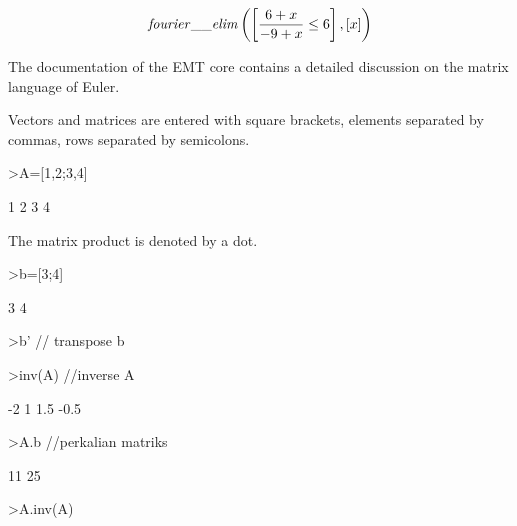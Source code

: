 \documentclass{article}
\begin{document}
\begin{eulernotebook}
\begin{eulercomment}
\begin{eulercomment}
\begin{eulercomment}
\begin{eulercomment}
\begin{euleroutput}
\end{euleroutput}
\begin{eulerformula}
\[
{\it fourier\_\_elim}\left(\left[ \frac{6+x}{-9+x}\leq 6 \right] 
  , \left[ x \right] \right)
\]
\end{eulerformula}
\begin{eulercomment}
The documentation of the EMT core contains a detailed discussion on the
matrix language of Euler.

Vectors and matrices are entered with square brackets, elements separated by
commas, rows separated by semicolons.
\end{eulercomment}
\begin{eulerprompt}
>A=[1,2;3,4]
\end{eulerprompt}
\begin{euleroutput}
              1             2 
              3             4 
\end{euleroutput}
\begin{eulercomment}
The matrix product is denoted by a dot.
\end{eulercomment}
\begin{eulerprompt}
>b=[3;4]
\end{eulerprompt}
\begin{euleroutput}
              3 
              4 
\end{euleroutput}
\begin{eulerprompt}
>b' // transpose b
\end{eulerprompt}
\begin{euleroutput}
  [3,  4]
\end{euleroutput}
\begin{eulerprompt}
>inv(A) //inverse A
\end{eulerprompt}
\begin{euleroutput}
             -2             1 
            1.5          -0.5 
\end{euleroutput}
\begin{eulerprompt}
>A.b //perkalian matriks
\end{eulerprompt}
\begin{euleroutput}
             11 
             25 
\end{euleroutput}
\begin{eulerprompt}
>A.inv(A)
\end{eulerprompt}

\end{eulercomment}
\end{eulercomment}
\end{eulercomment}
\end{eulercomment}
\end{eulernotebook}
\end{document}
